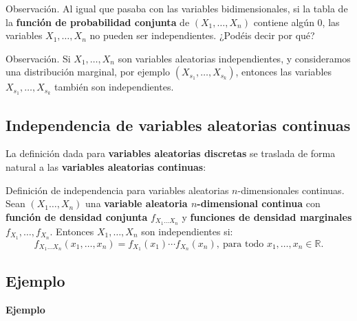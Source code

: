 \documentclass[]{book}
\begin{document}
Observación.
Al igual que pasaba con las variables bidimensionales, si la tabla de la \textbf{función de probabilidad conjunta} de \((X_1,\ldots,X_n)\) contiene algún \(0\), las variables \(X_1,\ldots, X_n\) no pueden ser independientes. ¿Podéis decir por qué?

 Observación.
Si \(X_1,\ldots, X_n\) son variables aleatorias independientes, y consideramos una distribución marginal, por ejemplo \((X_{s_1},\ldots,X_{s_k})\), entonces las variables \(X_{s_1},\ldots,X_{s_k}\) también son independientes.

\hypertarget{independencia-de-variables-aleatorias-continuas-1}{%
\subsection{Independencia de variables aleatorias continuas}\label{independencia-de-variables-aleatorias-continuas-1}}

La definición dada para \textbf{variables aleatorias discretas} se traslada de forma natural a las \textbf{variables aleatorias continuas}:

Definición de independencia para variables aleatorias \(n\)-dimensionales continuas.
Sean \((X_1\ldots,X_n)\) una \textbf{variable aleatoria \(n\)-dimensional continua} con \textbf{función de densidad conjunta} \(f_{X_1\ldots X_n}\) y \textbf{funciones de densidad marginales} \(f_{X_1},\ldots,f_{X_n}\). Entonces \(X_1,\ldots, X_n\) son independientes si:
\[
f_{X_1\ldots X_n}(x_1,\ldots,x_n)=f_{X_1}(x_1)\cdots f_{X_n}(x_n),\ \mbox{para todo $x_1,\ldots,x_n\in\mathbb{R}$.}
\]

\hypertarget{ejemplo-121}{%
\subsection{Ejemplo}\label{ejemplo-121}}

\textbf{Ejemplo}
\end{document}
